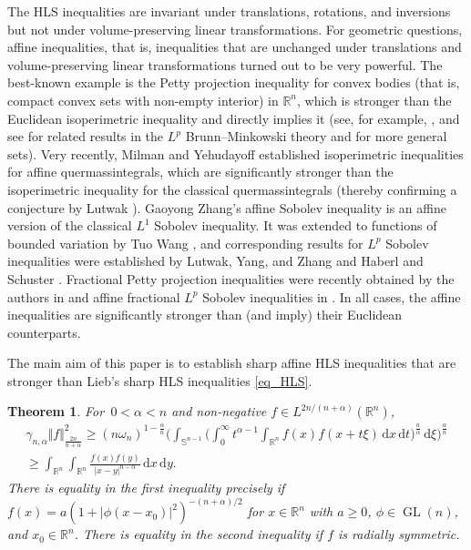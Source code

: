 \documentclass{amsart}
\newtheorem{theorem}{Theorem}
\newcommand{\gln}{\operatorname{GL}(n)}
\newcommand{\R}{\mathbb R}
\newcommand{\sn}{{\mathbb S}^{n-1}}
\renewcommand{\d}{\,\mathrm{d}}
\begin{document}
The HLS inequalities are invariant under translations, rotations, and inversions but not under volume-preserving linear transformations. For geometric questions, affine inequalities, that is, inequalities that are unchanged under translations and volume-preserving linear transformations turned out to be very powerful. 
The best-known example is the Petty projection inequality for convex bodies (that is, compact convex sets with non-empty interior) in $\R^n$, which is stronger than the Euclidean isoperimetric inequality and directly implies it (see, for example, \cite{Schneider:CB2, Gardner}, and see \cite{LYZ2000,Haberl:Schuster1, Zhang99, Tuo_Wang} for related results in the $L^p$ Brunn--Minkowski theory and for more general sets). 
Very recently, Milman and Yehudayoff \cite{MilmanYehudayoff} established isoperimetric inequalities for affine quermassintegrals, which are significantly stronger than the isoperimetric inequality for the classical quermassintegrals (thereby confirming a conjecture by Lutwak \cite{Lutwak88b}).
Gaoyong Zhang's affine Sobolev inequality \cite{Zhang99} is an affine version of the classical $L^1$ Sobolev inequality. 
It was extended to functions of bounded variation by Tuo Wang \cite{Tuo_Wang}, and corresponding results for $L^p$ Sobolev inequalities were established by Lutwak, Yang, and Zhang \cite{LYZ2002b} and Haberl and Schuster \cite{Haberl:Schuster2}. 
Fractional Petty projection inequalities were recently obtained by the authors in \cite{HaddadLudwig_fracsob} and affine fractional $L^p$ Sobolev inequalities  in \cite{HaddadLudwig_fracsob, HaddadLudwig_Lpfracsob}. In all cases, the affine inequalities are significantly stronger than (and imply) their Euclidean counterparts.

\goodbreak
The main aim of this paper is to establish sharp affine HLS inequalities that are stronger than Lieb's sharp HLS inequalities \eqref{eq_HLS}. 

\begin{theorem}\label{thm_aHLS}
For $\,0<\alpha<n$ and non-negative $f\in L^{{2n}/({n+\alpha})}(\R^n)$,
\begin{multline}
\gamma_{n,\alpha} \Vert f\Vert_{\frac{2n}{n+\alpha}}^2
\ge
(n \omega_n)^{1-\frac \alpha n}\Big( 
\int_{\sn}\big(\int_0^\infty t^{\alpha-1} \int_{\R^n} f(x)f(x+t\xi) \d x\d t\big)^{\frac n \alpha}\d \xi\Big)^{\frac \alpha n} \\
\ge
\int_{\R^n}\int_{\R^n} \frac{f(x) f(y)}{\vert x-y\vert^{n-\alpha}} \d x\d y.
\end{multline}
There is equality in the first inequality precisely if $f(x) = a (1 +|\phi (x-x_0)|^2)^{-(n+\alpha)/2}$ for $x\in\R^n$ with $a\ge 0$, $\phi\in\gln$, and $x_0\in\R^n$.
There is equality in the second inequality if $f$ is radially symmetric.
\end{theorem}
\end{document}
